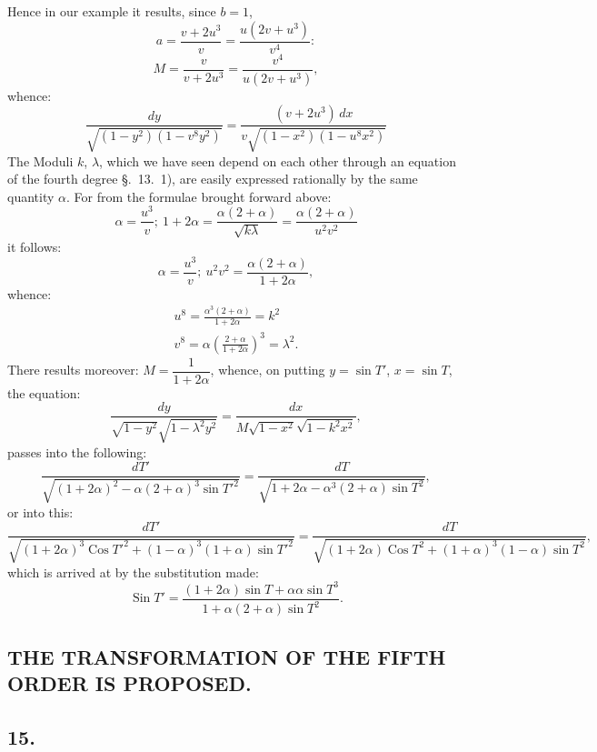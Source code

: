 \documentclass{article}
\begin{document}

Hence in our example it results, since $b=1$,
\[
a=\frac{v+2u^{3}}{v}=\frac{u(2v+u^{3})}{v^{4}}:
\]
\[
M=\frac{v}{v+2u^{3}}=\frac{v^{4}}{u(2v+u^{3})},
\]
whence:
\[
\frac{dy}{\sqrt{(1-y^{2})(1-v^{8}y^{2})}}=\frac{(v+2u^{3})\,dx}{v\sqrt{(1-x^{2})(1-u^{8}x^{2})}}
\]
The Moduli $k$, $\lambda$, which we have seen depend on each other through an equation of the fourth degree §.\ 13.\ 1), are easily expressed rationally by the same quantity $\alpha$. For from the formulae brought forward above:
\[
\alpha=\frac{u^{3}}{v};\ 1+2\alpha=\frac{\alpha(2+\alpha)}{\sqrt{k\lambda}}=\frac{\alpha(2+\alpha)}{u^{2}v^{2}}
\]
it follows:
\[
\alpha=\frac{u^{3}}{v};\ u^{2}v^{2}=\frac{\alpha(2+\alpha)}{1+2\alpha},
\]
whence:
\[
\begin{gathered}
u^{8}=\frac{\alpha^{3}(2+\alpha)}{1+2\alpha}=k^{2}\\
v^{8}=\alpha\left(\frac{2+\alpha}{1+2\alpha}\right)^{3}=\lambda^{2}.
\end{gathered}
\]
There results moreover: $M=\dfrac{1}{1+2\alpha}$, whence, on putting $y=\sin T'$, $x=\sin T$, the equation:
\[
\frac{dy}{\sqrt{1-y^{2}}\sqrt{1-\lambda^{2}y^{2}}}=\frac{dx}{M\sqrt{1-x^{2}}\sqrt{1-k^{2}x^{2}}},
\]
passes into the following:
\[
\frac{dT'}{\sqrt{(1+2\alpha)^{2}-\alpha(2+\alpha)^{3}\sin T'^{2}}}=\frac{dT}{\sqrt{1+2\alpha-\alpha^{3}(2+\alpha)\sin T^{2}}},
\]
or into this:
\[
\frac{dT'}{\sqrt{(1+2\alpha)^{3}\operatorname{Cos}T'^{2}+(1-\alpha)^{3}(1+\alpha)\sin T'^{2}}}=\frac{dT}{\sqrt{(1+2\alpha)\operatorname{Cos}T^{2}+(1+\alpha)^{3}(1-\alpha)\sin T^{2}}},
\]
which is arrived at by the substitution made:
\[
\operatorname{Sin}T'=\frac{(1+2\alpha)\sin T+\alpha\alpha\sin T^{3}}{1+\alpha(2+\alpha)\sin T^{2}}.
\]


\subsection*{THE TRANSFORMATION OF THE FIFTH ORDER IS PROPOSED.}

\subsection*{15.}
\end{document}
